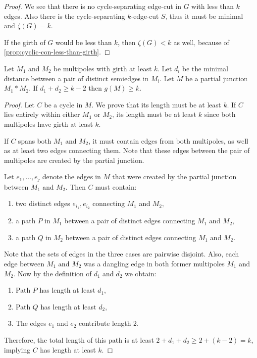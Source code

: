 \documentclass[12pt, twoside]{book}
\begin{document}
\begin{proof}
	We see that there is no cycle-separating edge-cut in $G$ with less than $k$ edges. Also there is the \mbox{cycle-separating} $k$-edge-cut $S$, thus it must be minimal and $\zeta(G)=k$.
	
	If the girth of $G$ would be less than $k$, then ${\zeta(G)<k}$ as well, because of \cref{prop:cyclic-con-less-than-girth}.
\end{proof}

\begin{lemma}\label{lem:cyclic-multipoles-with-girth-and-distance}
	Let $M_1$ and $M_2$ be multipoles with girth at least $k$. Let $d_i$ be the minimal distance between a pair of distinct semiedges in $M_i$. Let $M$ be a partial junction $M_1*M_2$. If $d_1+d_2\geq k-2$ then $g(M)\geq k$.
\end{lemma}

\begin{proof}
	Let $C$ be a cycle in $M$. We prove that its length must be at least $k$. If $C$ lies entirely within either $M_1$ or $M_2$, its length must be at least $k$ since both multipoles have girth at least $k$.
	
	If $C$ spans both $M_1$ and $M_2$, it must contain edges from both multipoles, as well as at least two edges connecting them. Note that these edges between the pair of multipoles are created by the partial junction.
	
	Let $e_1,\dots,e_j$ denote the edges in $M$ that were created by the partial junction between $M_1$ and $M_2$. Then $C$ must contain:
	\begin{enumerate}[label=(\roman*)]
		\item two distinct edges $e_{i_1},e_{i_2}$ connecting $M_1$ and $M_2$,
		\item a path $P$ in $M_1$ between a pair of distinct edges connecting $M_1$ and $M_2$,
		\item a path $Q$ in $M_2$ between a pair of distinct edges connecting $M_1$ and $M_2$.
	\end{enumerate}
	Note that the sets of edges in the three cases are pairwise disjoint. Also, each edge between $M_1$ and $M_2$ was a dangling edge in both former multipoles $M_1$ and $M_2$. Now by the definition of $d_1$ and $d_2$ we obtain:
	
	\begin{enumerate}[label=(\roman*)]
		\item Path $P$ has length at least $d_1$,
		\item Path $Q$ has length at least $d_2$,
		\item The edges $e_1$ and $e_2$ contribute length 2.
	\end{enumerate}
	
	Therefore, the total length of this path is at least $2+d_1+d_2 \geq 2+(k-2) = k$, implying $C$ has length at least $k$.
\end{proof}
\end{document}
